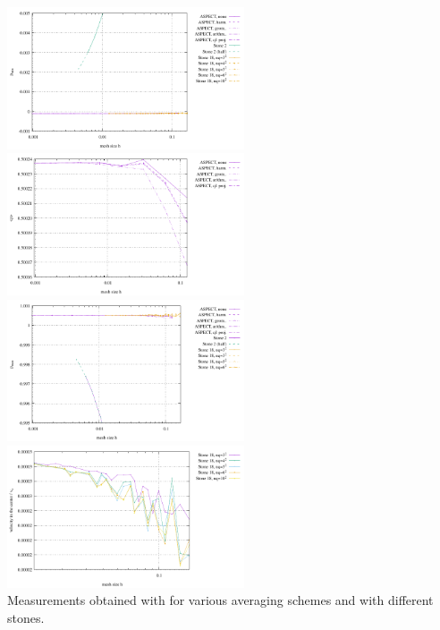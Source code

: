 \begin{center}
\includegraphics[width=7cm]{images/stokes_sphere2D/pressure_min_OT}
\includegraphics[width=7cm]{images/stokes_sphere2D/pressure_mean_OT}\\
\includegraphics[width=7cm]{images/stokes_sphere2D/pressure_max_OT}
\includegraphics[width=7cm]{images/stokes_sphere2D/center_velocity_OT}\\
{\captionfont Measurements obtained with \aspect for various averaging schemes and with different stones.}
\end{center}

